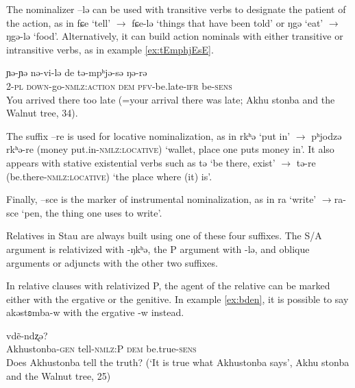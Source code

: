 \documentclass[oneside,a4paper,11pt]{article}
\newcommand{\ipa}[1]{{\phon #1}} %
\begin{document}
The nominalizer \ipa{--lə} can be used with transitive verbs to designate the patient of the action, as in \ipa{fɕe} `tell' $\rightarrow$ \ipa{fɕe-lə} `things that have been told' or \ipa{ŋgə} `eat' $\rightarrow$ \ipa{ŋgə-lə} `food'. Alternatively, it can build action nominals with either transitive or intransitive verbs, as  in example \ref{ex:tEmphjEsE}.

\begin{exe}
\ex \label{ex:tEmphjEsE} 
\gll
\ipa{ɲə-ɲə} 	\ipa{nə-vi-lə} 	\ipa{de} 	\ipa{tə-mpʰjə-sə} 	\ipa{ŋə-rə} \\
2-\textsc{pl} \textsc{down}-go-\textsc{nmlz:action} \textsc{dem} \textsc{pfv}-be.late-\textsc{ifr} be-\textsc{sens}\\
\glt You arrived there too late (=your arrival there was late; Akhu stonba and the Walnut tree, 34).
\end{exe}

The suffix \ipa{--re} is used for locative nominalization, as in \ipa{rkʰə} `put in' $\rightarrow$ \ipa{pʰjodzə} \ipa{rkʰə-re} (money put.in-\textsc{nmlz:locative}) `wallet, place one puts money in'. It also appears with stative existential verbs such as \ipa{tə} `be there, exist' $\rightarrow$ \ipa{tə-re} (be.there-\textsc{nmlz:locative}) `the place where (it) is'. 

Finally, \ipa{--sce} is the marker of instrumental nominalization, as in \ipa{ra} `write' $\rightarrow$\ipa{ra-sce} `pen, the thing one uses to write'.

Relatives in Stau are always built using one of these four suffixes. The S/A  argument is relativized with \ipa{-ŋkʰə}, the P argument with \ipa{-lə}, and oblique arguments or adjuncts with the other two suffixes. 

In relative clauses with relativized P, the agent of the relative can be marked either with the ergative or the genitive. In example \ref{ex:bden}, it is possible to say  \ipa{akəstʚmba-w} with the ergative \ipa{-w} instead.

\begin{exe}
\ex \label{ex:bden}
\gll 
 [\ipa{akəstʚmba-j} 	\ipa{fɕe-lə}] 	\ipa{de} 	\ipa{vdẽ-ndʐə?} \\
 Akhustonba-\textsc{gen} tell-\textsc{nmlz:P} \textsc{dem} be.true-\textsc{sens} \\
\glt Does Akhustonba tell the truth?  (`It is true what Akhustonba says', Akhu stonba and the Walnut tree, 25)
\end{exe}
\end{document}

